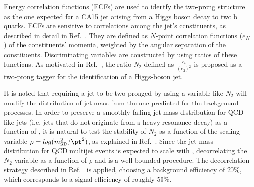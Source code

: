 Energy correlation functions (ECFs) are used to identfy the two-prong structure as the one expected for a CA15 jet arising from a Higgs boson decay to two b quarks. ECFs are sensitive to correlations among the jet's constituents, as described in detail in Ref.~\cite{ecf}. They are defined as $N$-point correlation functions ($e_N$) of the constituents' momenta, weighted by the angular separation of the constituents. Discriminating variables are constructed by using ratios of these functions.
%                                                                                                                                                                                                
As motivated in Ref.~\cite{ecf}, the ratio $N_2$ defined as $\frac{e_3}{(e_2)^2}$ is proposed as a two-prong tagger for the identification of a Higgs-boson jet.



It is noted that requiring a jet to be two-pronged by using a variable like $N_2$ will modify the distribution of jet mass from the one predicted for the background processes. In order to preserve a smoothly falling jet mass distribution for QCD-like jets (i.e. jets that do not originate from a heavy resonance decay) as a function of \pt, it is natural to test the stability of $N_2$ as a function of the scaling variable $\rho=log(m_{\text{SD}}^2/\pt^2)$, as explained in Ref.~\cite{ddt}. Since the jet mass distribution for QCD multijet events is expected to scale with \pt, decorrelating the $N_2$ variable as a function of $\rho$ and \pt is a well-bounded procedure. The decorrelation strategy described in Ref.~\cite{ddt} is applied, choosing a background efficiency of 20\%, which corresponds to a signal efficiency of roughly 50\%.

